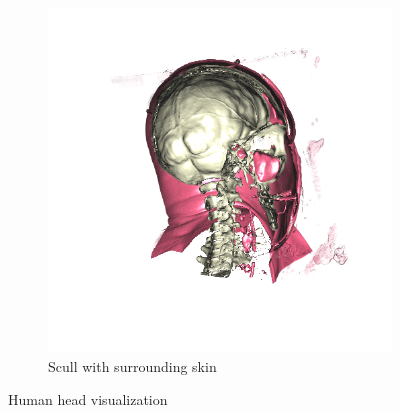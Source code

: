 \documentclass{article}
\begin{document}
\begin{figure}
\begin{subfigure}[h]{0.45\textwidth}
		\includegraphics[width=\textwidth]{skel-surf.png}
		\caption{Scull with surrounding skin}
		\label{fig:skin}
	\end{subfigure}
	\caption{Human head visualization}\label{fig:5}
\end{figure}
\end{document}
